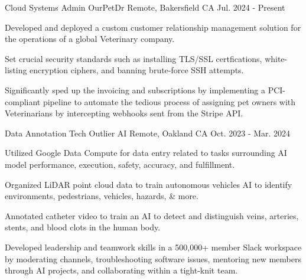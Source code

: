 
\begin{cventries}

  \cventry
    {Cloud Systems Admin} %
    {OurPetDr} %
    {Remote, Bakersfield CA} %
    {Jul. 2024 - Present} %
    {
      \begin{cvitems} %
		  \item {Developed and deployed a custom customer relationship management solution for the operations of a global Veterinary company.}
		  \item {Set crucial security standards such as installing TLS/SSL certfications, white-listing encryption ciphers, and banning brute-force SSH attempts.}
		  \item {Significantly sped up the invoicing and subscriptions by implementing a PCI-compliant pipeline to automate the tedious process of assigning pet owners with Veterinarians by intercepting webhooks sent from the Stripe API.}
      \end{cvitems}
    }

  \cventry
    {Data Annotation Tech} %
    {Outlier AI} %
    {Remote, Oakland CA} %
    {Oct. 2023 - Mar. 2024} %
    {
      \begin{cvitems} %
		  \item {Utilized Google Data Compute for data entry related to tasks surrounding AI model performance, execution, safety, accuracy, and fulfillment.}
		  \item {Organized LiDAR point cloud data to train autonomous vehicles AI to identify environments, pedestrians, vehicles, hazards, \& more.}
		  \item {Annotated catheter video to train an AI to detect and distinguish veins, arteries, stents, and blood clots in the human body.}
		  \item {Developed leadership and teamwork skills in a 500,000+ member Slack workspace by moderating channels, troubleshooting software issues, mentoring new members through AI projects, and collaborating within a tight-knit team.}
      \end{cvitems}
    }


\end{cventries}
